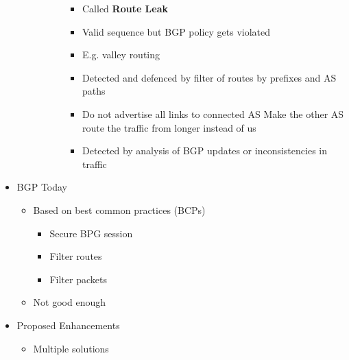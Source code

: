 \begin{itemize}
\begin{itemize}
\begin{itemize}
\begin{itemize}
                                \begin{itemize}
                                    \item Called \textbf{Route Leak}
                                    \item Valid sequence but BGP policy gets violated
                                    \item E.g. valley routing
                                    \item Detected and defenced by filter of routes by prefixes and AS paths
                                \end{itemize}
                                \begin{itemize}
                                    \item Do not advertise all links to connected AS
                                     Make the other AS route the traffic from longer instead of us
                                    \item Detected by analysis of BGP updates or inconsistencies in traffic
                                \end{itemize}
                        \end{itemize}
                \end{itemize}
        \end{itemize}
    \item BGP Today
        \begin{itemize}
            \item Based on best common practices (BCPs)
                \begin{itemize}
                    \item Secure BPG session
                    \item Filter routes
                    \item Filter packets
                \end{itemize}
            \item Not good enough
        \end{itemize}
    \item Proposed Enhancements
        \begin{itemize}
            \item Multiple solutions
                \begin{itemize}

\end{itemize}
\end{itemize}
\end{itemize}
